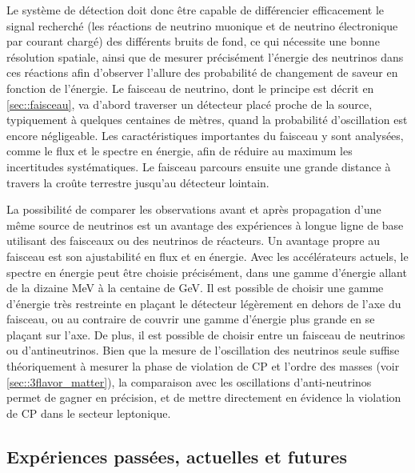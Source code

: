       Le système de détection doit donc être capable de différencier efficacement le signal recherché (les réactions de neutrino muonique et de neutrino électronique par courant chargé) des différents bruits de fond, ce qui nécessite une bonne résolution spatiale, ainsi que de mesurer précisément l'énergie des neutrinos dans ces réactions afin d'observer l'allure des probabilité de changement de saveur en fonction de l'énergie. Le faisceau de neutrino, dont le principe est décrit en \autoref{sec::faisceau}, va d'abord traverser un détecteur placé proche de la source, typiquement à quelques centaines de mètres, quand la probabilité d'oscillation est encore négligeable. Les caractéristiques importantes du faisceau y sont analysées, comme le flux et le spectre en énergie, afin de réduire au maximum les incertitudes systématiques. Le faisceau parcours ensuite une grande distance à travers la croûte terrestre jusqu'au détecteur lointain. 
    
      La possibilité de comparer les observations avant et après propagation d'une même source de neutrinos est un avantage des expériences à longue ligne de base utilisant des faisceaux ou des neutrinos de réacteurs. Un avantage propre au faisceau est son ajustabilité en flux et en énergie. Avec les accélérateurs actuels, le spectre en énergie peut être choisie précisément, dans une gamme d'énergie allant de la dizaine \si{\mega\electronvolt} à la centaine de \si{\giga\electronvolt}. Il est possible de choisir une gamme d'énergie très restreinte en plaçant le détecteur légèrement en dehors de l'axe du faisceau, ou au contraire de couvrir une gamme d'énergie plus grande en se plaçant sur l'axe. De plus, il est possible de choisir entre un faisceau de neutrinos ou d'antineutrinos. Bien que la mesure de l'oscillation des neutrinos seule suffise théoriquement à mesurer la phase de violation de CP et l'ordre des masses (voir \autoref{sec::3flavor_matter}), la comparaison avec les oscillations d'anti-neutrinos permet de gagner en précision, et de mettre directement en évidence la violation de CP dans le secteur leptonique. 

    \subsection{Expériences passées, actuelles et futures}

